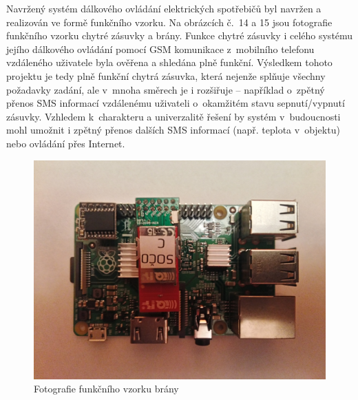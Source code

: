\documentclass[12pt,a4paper,oneside]{article}
\begin{document}

Navržený systém dálkového ovládání elektrických spotřebičů byl navržen a realizován ve formě funkčního vzorku. Na obrázcích č.~14 a 15 jsou fotografie funkčního vzorku chytré zásuvky a brány. Funkce chytré zásuvky i celého systému jejího dálkového ovládání pomocí GSM komunikace z~mobilního telefonu vzdáleného uživatele byla ověřena a shledána plně funkční. Výsledkem tohoto projektu je tedy plně funkční chytrá zásuvka, která nejenže splňuje všechny požadavky zadání, ale v~mnoha směrech je i rozšiřuje – například o~zpětný přenos SMS informací vzdálenému uživateli o~okamžitém stavu sepnutí/vypnutí zásuvky. Vzhledem k~charakteru a univerzalitě řešení by systém v~budoucnosti mohl umožnit i zpětný přenos dalších SMS informací (např. teplota v~objektu) nebo ovládání přes Internet.

\begin{figure}[H]
\centering
\label{fig:foto/brana}
\includegraphics[width = 128mm]{img/foto/brana.jpg}
\caption{Fotografie funkčního vzorku brány}
\end{figure}
\end{document}
